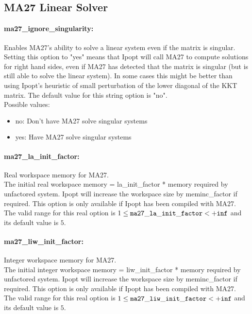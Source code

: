 \subsection{MA27 Linear Solver}
\label{sec:MA27LinearSolver}
\paragraph{ma27\_ignore\_singularity:}\label{opt:ma27_ignore_singularity} Enables MA27's ability to solve a linear system even if the matrix is singular. \\
 Setting this option to "yes" means that Ipopt will call MA27 to compute solutions for right hand sides, even if MA27 has detected that the matrix is singular (but is still able to solve the linear system). In some cases this might be better than using Ipopt's heuristic of small perturbation of the lower diagonal of the KKT matrix. The default value for this string option is "no".
\\ 
Possible values:
\begin{itemize}
   \item no: Don't have MA27 solve singular systems
   \item yes: Have MA27 solve singular systems
\end{itemize}

\paragraph{ma27\_la\_init\_factor:}\label{opt:ma27_la_init_factor} Real workspace memory for MA27. \\
 The initial real workspace memory = la\_init\_factor * memory required by unfactored system. Ipopt will increase the workspace size by meminc\_factor if required.  This option is only available if  Ipopt has been compiled with MA27. The valid range for this real option is 
$1 \le {\tt ma27\_la\_init\_factor } <  {\tt +inf}$
and its default value is $5$.


\paragraph{ma27\_liw\_init\_factor:}\label{opt:ma27_liw_init_factor} Integer workspace memory for MA27. \\
 The initial integer workspace memory = liw\_init\_factor * memory required by unfactored system. Ipopt will increase the workspace size by meminc\_factor if required.  This option is only available if Ipopt has been compiled with MA27. The valid range for this real option is 
$1 \le {\tt ma27\_liw\_init\_factor } <  {\tt +inf}$
and its default value is $5$.


